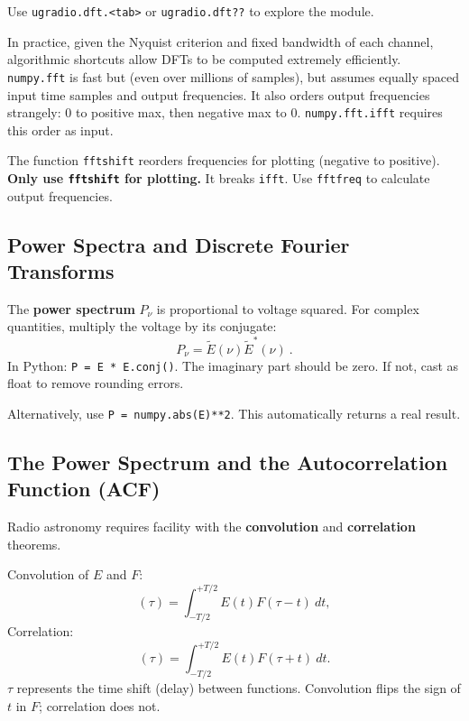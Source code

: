 \documentclass[11pt,preprint]{aastex}
\begin{document}
Use {\tt ugradio.dft.<tab>} or {\tt ugradio.dft??} to explore the module.

In practice, given the Nyquist criterion and fixed bandwidth of each channel,
algorithmic shortcuts allow DFTs to be computed
extremely efficiently.
\verb$numpy.fft$ is fast but (even over millions of samples), but assumes
equally spaced input time samples and output frequencies.
It also orders output frequencies strangely: 0 to positive max, then negative max to 0.
\verb$numpy.fft.ifft$ requires this order as input.

The function \verb$fftshift$ reorders frequencies for plotting (negative to positive).
\textbf{Only use {\tt fftshift} for plotting.}
It breaks \verb$ifft$.
Use \verb$fftfreq$ to calculate output frequencies.


\subsection{Power Spectra and Discrete Fourier Transforms}
\label{pwrspect}

\noindent
The {\bf power spectrum} $P_\nu$ is proportional to voltage squared.
For complex quantities, multiply the voltage by its conjugate:
%
\begin{equation}
P_\nu = \tilde E(\nu) \tilde E^*(\nu) \ .
\end{equation}
%
\noindent In Python: {\tt P = E * E.conj()}.
The imaginary part should be zero.
If not, cast as float to remove rounding errors.

Alternatively, use \verb$P = numpy.abs(E)**2$.
This automatically returns a real result.


\subsection{The Power Spectrum and the Autocorrelation Function (ACF)}
\label{acf}

\noindent
Radio astronomy requires facility with the {\bf convolution} and
{\bf correlation} theorems.

Convolution of $E$ and $F$:
%
\begin{equation}
[E * F](\tau) = \int_{-T/2}^{+T/2} E(t) F(\tau - t) \ dt,
\end{equation}
%
Correlation:
%
\begin{equation}
[E\star F](\tau) = \int_{-T/2}^{+T/2} E(t) F(\tau + t) \ dt.
\end{equation}
%
\noindent $\tau$ represents the time shift (delay) between functions.
Convolution flips the sign of $t$ in $F$; correlation does not.
\end{document}
